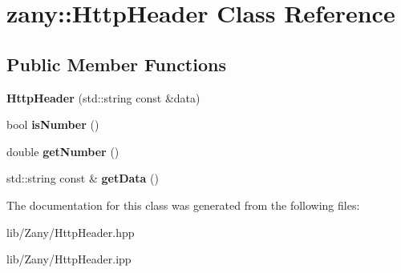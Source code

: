 \hypertarget{classzany_1_1_http_header}{}\section{zany\+:\+:Http\+Header Class Reference}
\label{classzany_1_1_http_header}
\subsection*{Public Member Functions}
\begin{DoxyCompactItemize}
\item 
\mbox{\label{classzany_1_1_http_header_a652159c107c2cd792e9e5c1713ac64e8}} 
{\bfseries Http\+Header} (std\+::string const \&data)
\item 
\mbox{\label{classzany_1_1_http_header_aaaab1529d5c88ce01202311fe4b08fa4}} 
bool {\bfseries is\+Number} ()
\item 
\mbox{\label{classzany_1_1_http_header_a231241a670391cf7a2893f125585c2bf}} 
double {\bfseries get\+Number} ()
\item 
\mbox{\label{classzany_1_1_http_header_a5b2fadd9a946345dddf8f4a773733447}} 
std\+::string const  \& {\bfseries get\+Data} ()
\end{DoxyCompactItemize}


The documentation for this class was generated from the following files\+:\begin{DoxyCompactItemize}
\item 
lib/\+Zany/Http\+Header.\+hpp\item 
lib/\+Zany/Http\+Header.\+ipp\end{DoxyCompactItemize}
